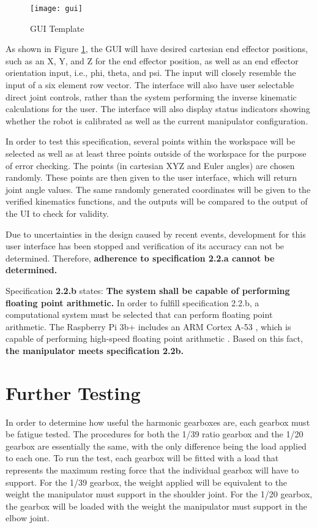 \let\clearpage\relax
\begin{figure}[htp]
  \centering
  \texttt{[image: gui]}
  \caption{GUI Template}
  \label{fig:gui}
\end{figure}

As shown in Figure \ref{fig:gui}, the GUI will have desired cartesian end effector positions, such as an X, Y, and Z for the end effector position, as well as an end effector orientation input, i.e., phi, theta, and psi. The input will closely resemble the input of a six element row vector. The interface will also have user selectable direct joint controls, rather than the system performing the inverse kinematic calculations for the user. The interface will also display status indicators showing whether the robot is calibrated as well as the current manipulator configuration.

In order to test this specification, several points within the workspace will be selected as well as at least three points outside of the workspace for the purpose of error checking. The points (in cartesian XYZ and Euler angles) are chosen randomly. These points are then given to the user interface, which will return joint angle values. The same randomly generated coordinates will be given to the verified kinematics functions, and the outputs will be compared to the output of the UI to check for validity.

\newpage
Due to uncertainties in the design caused by recent events, development for this user interface has been stopped and verification of its accuracy can not be determined. Therefore, \textbf{adherence to specification 2.2.a cannot be determined.}


Specification \textbf{2.2.b} states: \textbf{The system shall be capable of performing floating point arithmetic.} In order to fulfill specification 2.2.b, a computational system must be selected that can perform floating point arithmetic. The Raspberry Pi 3b+ includes an ARM Cortex A-53 \cite{rpi}, which is capable of performing high-speed floating point arithmetic \cite{arm}. Based on this fact, \textbf{the manipulator meets specification 2.2b.}


\section{Further Testing}

In order to determine how useful the harmonic gearboxes are, each gearbox must be fatigue tested. The procedures for both the 1/39 ratio gearbox and the 1/20 gearbox are essentially the same, with the only difference being the load applied to each one. To run the test, each gearbox will be fitted with a load that represents the maximum resting force that the individual gearbox will have to support. For the 1/39 gearbox, the weight applied will be equivalent to the weight the manipulator must support in the shoulder joint. For the 1/20 gearbox, the gearbox will be loaded with the weight the manipulator must support in the elbow joint.

